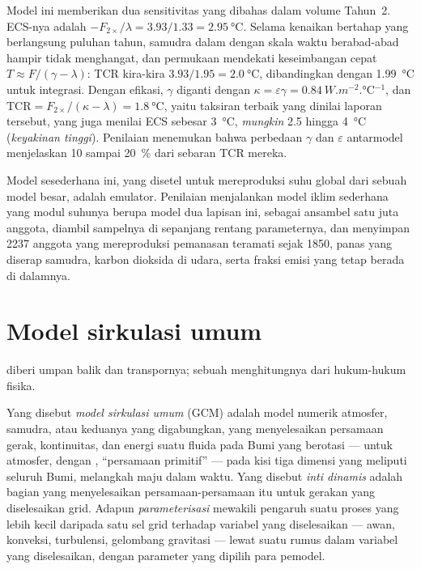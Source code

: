 Model ini memberikan dua sensitivitas yang dibahas dalam volume Tahun~2. ECS-nya adalah
$-F_{2\times}/\lambda = 3.93/1.33 = \qty{2.95}{\celsius}$. Selama kenaikan bertahap
yang berlangsung puluhan tahun, samudra dalam dengan skala waktu berabad-abad hampir
tidak menghangat, dan permukaan mendekati keseimbangan cepat $T \approx F/(\gamma -
\lambda)$: TCR kira-kira $3.93/1.95 = \qty{2.0}{\celsius}$, dibandingkan
dengan \qty{1.99}{\celsius} untuk integrasi. Dengan efikasi, $\gamma$ diganti
dengan $\kappa = \varepsilon\gamma = \qty{0.84}{W.m^{-2}.\celsius^{-1}}$,
dan $\text{TCR} = F_{2\times}/(\kappa - \lambda) = \qty{1.8}{\celsius}$,
yaitu taksiran terbaik yang dinilai laporan tersebut, yang juga menilai ECS sebesar
\qty{3}{\celsius}, \emph{mungkin} 2.5 hingga \qty{4}{\celsius} (\emph{keyakinan
tinggi}). Penilaian menemukan bahwa perbedaan $\gamma$ dan
$\varepsilon$ antarmodel menjelaskan 10 sampai \qty{20}{\percent} dari
sebaran TCR mereka.

Model sesederhana ini, yang disetel untuk mereproduksi suhu global dari sebuah
model besar, adalah emulator. Penilaian menjalankan model iklim sederhana yang modul suhunya
berupa model dua lapisan ini, sebagai ansambel satu juta anggota, diambil sampelnya
di sepanjang rentang parameternya, dan menyimpan 2237 anggota yang mereproduksi
pemanasan teramati sejak 1850, panas yang diserap samudra, karbon
dioksida di udara, serta fraksi emisi yang tetap berada di dalamnya.

\section{Model sirkulasi umum}\label{sec:b3:climate-models:gcm}

 diberi umpan balik dan transpornya; sebuah
 menghitungnya dari hukum-hukum fisika.

\begin{definition}\label{def:b3:climate-models:gcm}
Yang disebut \emph{model sirkulasi umum} (GCM)
adalah model numerik atmosfer, samudra, atau keduanya yang digabungkan,
yang menyelesaikan persamaan gerak, kontinuitas, dan energi suatu fluida pada
Bumi yang berotasi --- untuk atmosfer, dengan
, ``persamaan primitif'' --- pada
kisi tiga dimensi yang meliputi seluruh Bumi, melangkah maju dalam waktu. Yang disebut \emph{inti
dinamis} adalah bagian yang menyelesaikan persamaan-persamaan itu untuk
gerakan yang diselesaikan grid. Adapun
\emph{parameterisasi} mewakili pengaruh suatu proses yang lebih kecil daripada satu sel grid
terhadap variabel yang diselesaikan --- awan,
konveksi, turbulensi, gelombang gravitasi --- lewat suatu rumus dalam variabel yang diselesaikan,
dengan parameter yang dipilih para pemodel.
\end{definition}

